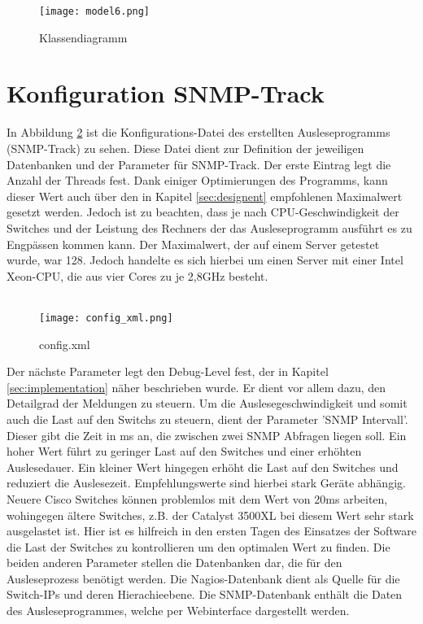 \begin{figure}[H]
\centering
\texttt{[image: model6.png]}
\caption[]{Klassendiagramm}
\label{fig:classdia6}
\end{figure}

\clearpage

\section*{Konfiguration SNMP-Track}
\label{sec:config}

In Abbildung \ref{fig:config_xml} ist die Konfigurations-Datei des erstellten Ausleseprogramms (SNMP-Track) zu sehen.
Diese Datei dient zur Definition der jeweiligen Datenbanken und der Parameter für SNMP-Track.
Der erste Eintrag legt die Anzahl der Threads fest. Dank einiger Optimierungen des Programms, kann dieser Wert auch über den in Kapitel \ref{sec:designent} empfohlenen Maximalwert gesetzt werden.
Jedoch ist zu beachten, dass je nach CPU-Geschwindigkeit der Switches und der Leistung des Rechners der das Ausleseprogramm ausführt es zu Engpässen kommen kann.
Der Maximalwert, der auf einem Server getestet wurde, war 128. Jedoch handelte es sich hierbei um einen Server mit einer Intel Xeon-CPU, die aus vier Cores zu je 2,8GHz besteht.\\\\

\begin{figure}[H]
\centering
\texttt{[image: config\_xml.png]}
\caption[]{config.xml}
\label{fig:config_xml}
\end{figure}

Der nächste Parameter legt den Debug-Level fest, der in Kapitel \ref{sec:implementation} näher beschrieben wurde.
Er dient vor allem dazu, den Detailgrad der Meldungen zu steuern.
Um die Auslesegeschwindigkeit und somit auch die Last auf den Switchs zu steuern, dient der Parameter 'SNMP Intervall'.
Dieser gibt die Zeit in ms an, die zwischen zwei SNMP Abfragen liegen soll. Ein hoher Wert führt zu geringer Last auf den Switches und einer erhöhten Auslesedauer.
Ein kleiner Wert hingegen erhöht die Last auf den Switches und reduziert die Auslesezeit.
Empfehlungswerte sind hierbei stark Geräte abhängig. Neuere Cisco Switches können problemlos mit dem Wert von 20ms arbeiten, wohingegen ältere Switches, z.B. der Catalyst 3500XL bei diesem Wert sehr stark ausgelastet ist.
Hier ist es hilfreich in den ersten Tagen des Einsatzes der Software die Last der Switches zu kontrollieren um den optimalen Wert zu finden.
Die beiden anderen Parameter stellen die Datenbanken dar, die für den Ausleseprozess benötigt werden.
Die Nagios-Datenbank dient als Quelle für die Switch-IPs und deren Hierachieebene.
Die SNMP-Datenbank enthält die Daten des Ausleseprogrammes, welche per Webinterface dargestellt werden.

